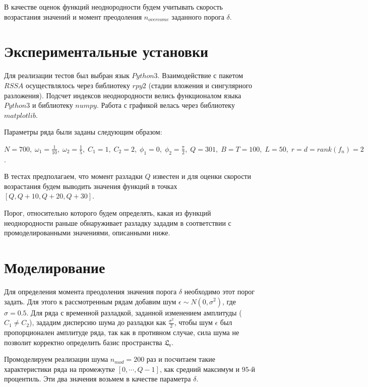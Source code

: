 \documentclass[specialist, substylefile = spbu.rtx,
			   subf, href, 12pt]{disser}
\begin{document}
В качестве оценок функций неоднородности будем учитывать скорость возрастания значений и момент преодоления $n_{overcome}$ заданного порога $\delta$.


\section{Экспериментальные установки}
Для реализации тестов был выбран язык $Python3$. Взаимодействие с пакетом $RSSA$ осуществлялось через библиотеку $rpy2$ (стадии вложения и сингулярного разложения). Подсчет индексов неоднородности велись функционалом языка $Python3$ и библиотеку $numpy$. Работа с графикой велась через библиотеку $matplotlib$. 

Параметры ряда были заданы следующим образом: 

$ N = 700, \;\omega_1 = \frac{1}{10},\; \omega_2 = \frac{1}{5},\; C_1 = 1, \; C_2 = 2,\; \phi_1=0,\; \phi_2=\frac{\pi}{2},\; Q = 301,\; B = T = 100,\; L = 50,\; r=d=rank(f_n)=2$.

В тестах предполагаем, что момент разладки $Q$ известен и для оценки скорости возрастания будем выводить значения функций в точках $[Q, Q+10, Q+20, Q+30]$.

Порог, относительно которого будем определять, какая из функций неоднородности раньше обнаруживает разладку зададим в  соответствии с промоделированными значениями, описанными ниже.

\section{Моделирование}
Для определения момента преодоления значения порога $\delta$ необходимо этот порог задать. Для этого к рассмотренным рядам добавим шум $\epsilon\sim N(0, \sigma^2)$, где $\sigma = 0.5$. Для ряда с временной разладкой, заданной изменением амплитуды ($C_1 \neq C_2$), зададим дисперсию шума до разладки как $\frac{\sigma^2}{2}$, чтобы шум $\epsilon$ был пропорционален амплитуде ряда, так как в противном случае, сила шума не позволит корректно определить базис пространства $ \mathfrak{L_r} $. 

Промоделируем реализации шума $n_{mod}=200$ раз и посчитаем такие характеристики ряда на промежутке $[0, \cdots, Q-1]$, как средний максимум и $95$-й процентиль. Эти два значения возьмем в качестве параметра $\delta$. 
\end{document}
